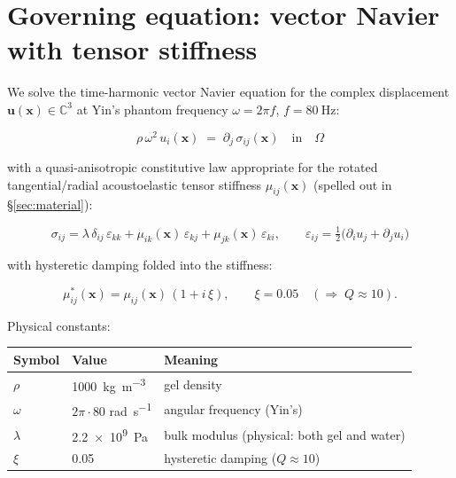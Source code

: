 \documentclass[11pt,letterpaper]{article}
\newcommand{\vect}[1]{\boldsymbol{#1}}
\begin{document}
\section{Governing equation: vector Navier with tensor stiffness}
\label{sec:governing}

We solve the time-harmonic vector Navier equation for the complex
displacement $\vect u(\vect x) \in \mathbb{C}^3$ at Yin's phantom
frequency $\omega = 2\pi f$, $f = \SI{80}{\hertz}$:

\begin{equation}
\boxed{\;
\rho\,\omega^2\, u_i(\vect x) \;=\; \partial_j\,\sigma_{ij}(\vect x)
\quad\text{in}\quad\Omega
\;}
\label{eq:navier}
\end{equation}

with a quasi-anisotropic constitutive law appropriate for the
rotated tangential/radial acoustoelastic tensor stiffness
$\mu_{ij}(\vect x)$ (spelled out in \S\ref{sec:material}):

\begin{equation}
\sigma_{ij}
= \lambda\,\delta_{ij}\,\varepsilon_{kk}
+ \mu_{ik}(\vect x)\,\varepsilon_{kj}
+ \mu_{jk}(\vect x)\,\varepsilon_{ki},
\qquad
\varepsilon_{ij} = \tfrac{1}{2}\bigl(\partial_i u_j + \partial_j u_i\bigr)
\label{eq:constitutive}
\end{equation}

with hysteretic damping folded into the stiffness:

\begin{equation}
\mu^{*}_{ij}(\vect x) = \mu_{ij}(\vect x)\,(1 + i\,\xi),
\qquad \xi = 0.05
\quad(\Rightarrow\; Q\!\approx\!10).
\end{equation}

Physical constants:

\begin{center}
\begin{tabular}{lll}
\toprule
Symbol & Value & Meaning \\
\midrule
$\rho$    & \SI{1000}{\kilogram\per\metre\cubed} & gel density \\
$\omega$  & $2\pi\cdot 80$ \si{\radian\per\second} & angular frequency (Yin's) \\
$\lambda$ & \SI{2.2e9}{\pascal} & bulk modulus (physical: both gel and water) \\
$\xi$     & 0.05 & hysteretic damping ($Q\approx 10$) \\
\bottomrule
\end{tabular}
\end{center}
\end{document}
